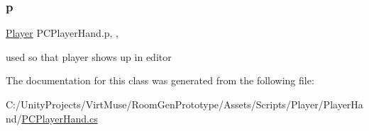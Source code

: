 \subsubsection{\texorpdfstring{p}{p}}
{\footnotesize\ttfamily \mbox{\hyperlink{class_player}{Player}} P\+C\+Player\+Hand.\+p\hspace{0.3cm}{\ttfamily [get]}, {\ttfamily [set]}, {\ttfamily [private]}}



used so that player shows up in editor 



The documentation for this class was generated from the following file\+:\begin{DoxyCompactItemize}
\item 
C\+:/\+Unity\+Projects/\+Virt\+Muse/\+Room\+Gen\+Prototype/\+Assets/\+Scripts/\+Player/\+Player\+Hand/\mbox{\hyperlink{_p_c_player_hand_8cs}{P\+C\+Player\+Hand.\+cs}}\end{DoxyCompactItemize}

